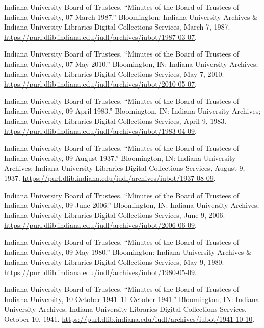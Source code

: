 \documentclass[
  american,
  letterpaper,
]{scrreprt}
\newlength{\cslhangindent}
\newenvironment{CSLReferences}[2] %
 {\begin{list}{}{%
  \setlength{\itemindent}{0pt}
  \setlength{\leftmargin}{0pt}
  \setlength{\parsep}{0pt}
  \ifodd #1
   \setlength{\leftmargin}{\cslhangindent}
   \setlength{\itemindent}{-1\cslhangindent}
  \fi
  \setlength{\itemsep}{#2\baselineskip}}}
 {\end{list}}
\begin{document}
\begin{CSLReferences}{1}{0}
Indiana University Board of Trustees. {``Minutes of the Board of
Trustees of Indiana University, 07 March 1987.''} Bloomington: Indiana
University Archives \& Indiana University Libraries Digital Collections
Services, March 7, 1987.
\url{https://purl.dlib.indiana.edu/iudl/archives/iubot/1987-03-07}.

Indiana University Board of Trustees. {``Minutes of the Board of
Trustees of Indiana University, 07 May 2010.''} Bloomington, IN: Indiana
University Archives; Indiana University Libraries Digital Collections
Services, May 7, 2010.
\url{https://purl.dlib.indiana.edu/iudl/archives/iubot/2010-05-07}.

Indiana University Board of Trustees. {``Minutes of the Board of
Trustees of Indiana University, 09 April 1983.''} Bloomington, IN:
Indiana University Archives; Indiana University Libraries Digital
Collections Services, April 9, 1983.
\url{https://purl.dlib.indiana.edu/iudl/archives/iubot/1983-04-09}.

Indiana University Board of Trustees. {``Minutes of the Board of
Trustees of Indiana University, 09 August 1937.''} Bloomington, IN:
Indiana University Archives; Indiana University Libraries Digital
Collections Services, August 9, 1937.
\url{https://purl.dlib.indiana.edu/iudl/archives/iubot/1937-08-09}.

Indiana University Board of Trustees. {``Minutes of the Board of
Trustees of Indiana University, 09 June 2006.''} Bloomington, IN:
Indiana University Archives; Indiana University Libraries Digital
Collections Services, June 9, 2006.
\url{https://purl.dlib.indiana.edu/iudl/archives/iubot/2006-06-09}.

Indiana University Board of Trustees. {``Minutes of the Board of
Trustees of Indiana University, 09 May 1980.''} Bloomington: Indiana
University Archives \& Indiana University Libraries Digital Collections
Services, May 9, 1980.
\url{https://purl.dlib.indiana.edu/iudl/archives/iubot/1980-05-09}.

Indiana University Board of Trustees. {``Minutes of the Board of
Trustees of Indiana University, 10 October 1941--11 October 1941.''}
Bloomington, IN: Indiana University Archives; Indiana University
Libraries Digital Collections Services, October 10, 1941.
\url{https://purl.dlib.indiana.edu/iudl/archives/iubot/1941-10-10}.


\end{CSLReferences}
\end{document}
